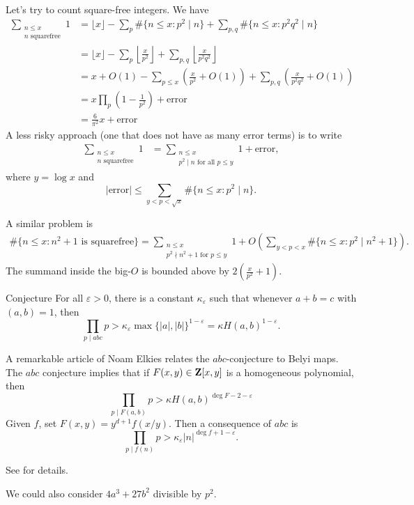 Let's try to count square-free integers. We have 
\begin{align*}
  \sum_{\substack{n\leqslant x \\ n\text{ squarefree}}} 1 
    &= \lfloor x\rfloor - \sum_p \#\{n\leqslant x:p^2\mid n\} + \sum_{p,q} \#\{n\leqslant x:p^2 q^2\mid n\} \\
    &= \lfloor x\rfloor - \sum_p \left\lfloor\frac{x}{p^2}\right\rfloor + \sum_{p,q} \left\lfloor\frac{x}{p^2 q^2}\right\rfloor \\
    &= x+O(1) - \sum_{p\leqslant x} \left(\frac{x}{p^2} + O(1)\right) + \sum_{p,q} \left(\frac{x}{p^2 q^2}+O(1)\right) \\
    &= x\prod_p \left(1-\frac{1}{p^2}\right) + \text{error} \\
    &= \frac{6}{\pi^2} x + \text{error}
\end{align*}
A less risky approach (one that does not have as many error terms) is to write 
\begin{align*}
  \sum_{\substack{n\leqslant x \\ n\text{ squarefree}}} 1
    &= \sum_{\substack{n\leqslant x \\ p^2\mid n\text{ for all }p\leqslant y}} 1 + \text{error} ,
\end{align*}
where $y=\log x$ and 
\[
  |\text{error}| \leqslant \sum_{y<p<\sqrt x} \# \{n\leqslant x:p^2\mid n\} .
\]

A similar problem is 
\begin{align*}
  \#\{n\leqslant x:n^2+1\text{ is squarefree}\} = \sum_{\substack{n\leqslant x \\ p^2\nmid n^2+1\text{ for }p\leqslant y}} 1 + O\left(\sum_{y<p<x} \# \{n\leqslant x:p^2\mid n^2+1\}\right) .
\end{align*}
The summand inside the big-$O$ is bounded above by 
$2\left(\frac{x}{p^2} + 1\right)$. 

\begin{enonce}{Conjecture}
For all $\varepsilon>0$, there is a constant $\kappa_\varepsilon$ such that 
whenever $a+b=c$ with $(a,b)=1$, then 
\[
  \prod_{p\mid a b c} p > \kappa_\varepsilon \max\{|a|,|b|\}^{1-\varepsilon} = \kappa H(a,b)^{1-\varepsilon} .
\]
\end{enonce}
A remarkable article of Noam Elkies relates the $abc$-conjecture to 
Belyi maps. The $abc$ conjecture implies that if $F(x,y)\in \mathbf{Z}[x,y]$ is a 
homogeneous polynomial, then 
\[
  \prod_{p\mid F(a,b)} p > \kappa H(a,b)^{\deg F-2-\varepsilon}
\]
Given $f$, set $F(x,y) = y^{d+1} f(x/y)$. Then a consequence of $abc$ is 
\[
  \prod_{p\mid f(n)} p > \kappa_\varepsilon |n|^{\deg f+1-\varepsilon} .
\]

See \cite{e91} for details. 

We could also consider $4 a^3+ 27 b^2$ divisible by $p^2$. 





